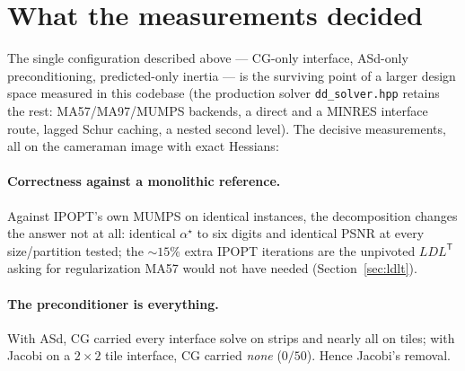 \documentclass[11pt]{article}
\newcommand{\code}[1]{\texttt{#1}}
\begin{document}
\section{What the measurements decided}
\label{sec:measured}

The single configuration described above --- CG-only interface, ASd-only
preconditioning, predicted-only inertia --- is the surviving point of a
larger design space measured in this codebase (the production solver
\code{dd\_solver.hpp} retains the rest: MA57/MA97/MUMPS backends, a direct
and a MINRES interface route, lagged Schur caching, a nested second level).
The decisive measurements, all on the cameraman image with exact Hessians:

\paragraph{Correctness against a monolithic reference.}  Against IPOPT's own
MUMPS on identical instances, the decomposition changes the answer not at
all: identical $\alpha^\star$ to six digits and identical PSNR at every
size/partition tested; the $\sim\!15\%$ extra IPOPT iterations are the
unpivoted $LDL^{\mathsf T}$ asking for regularization MA57 would not have
needed (Section~\ref{sec:ldlt}).

\paragraph{The preconditioner is everything.}  With ASd, CG carried every
interface solve on strips and nearly all on tiles; with Jacobi on a
$2\times 2$ tile interface, CG carried \emph{none} ($0/50$).  Hence Jacobi's
removal.
\end{document}
